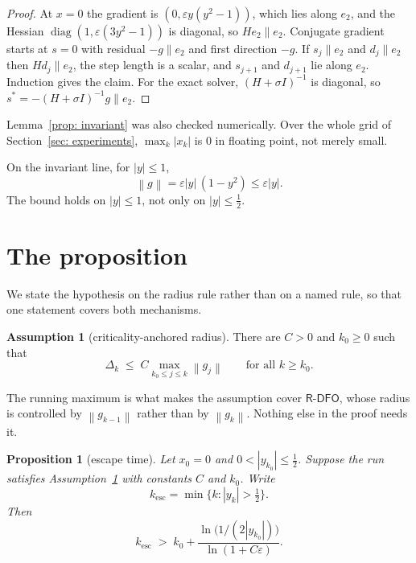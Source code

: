 \documentclass[11pt,a4paper]{article}
\providecommand{\abs}[1]{\left \vert #1 \right \vert}
\providecommand{\norm}[1]{\left \lVert #1 \right \rVert}
\providecommand{\Rdfo}{\textsf{R-DFO}}
\newtheorem{proposition}{Proposition}
\theoremstyle{definition}
\newtheorem{assumption}{Assumption}
\theoremstyle{remark}
\begin{document}
\begin{proof}
  At $x = 0$ the gradient is $(0, \varepsilon y(y^2-1))$, which lies along
  $e_2$, and the Hessian $\operatorname{diag}(1, \varepsilon(3y^2-1))$ is
  diagonal, so $He_2 \parallel e_2$. Conjugate gradient starts at $s = 0$ with
  residual $-g \parallel e_2$ and first direction $-g$. If $s_j \parallel e_2$
  and $d_j \parallel e_2$ then $Hd_j \parallel e_2$, the step length is a
  scalar, and $s_{j+1}$ and $d_{j+1}$ lie along $e_2$. Induction gives the
  claim. For the exact solver, $(H+\sigma I)^{-1}$ is diagonal, so
  $s^* = -(H+\sigma I)^{-1}g \parallel e_2$.
\end{proof}

Lemma~\ref{prop: invariant} was also checked numerically. Over the whole grid of
Section~\ref{sec: experiments}, $\max_k\abs{x_k}$ is $0$ in floating point, not
merely small.

On the invariant line, for $\abs{y} \leq 1$,
\begin{equation}
  \norm{g} = \varepsilon\abs{y}\,(1 - y^2) \leq \varepsilon\abs{y} .
  \label{eqn: gradient bound}
\end{equation}
The bound holds on $\abs{y} \leq 1$, not only on $\abs{y} \leq \tfrac12$.

\section{The proposition}\label{sec: proposition}

We state the hypothesis on the radius rule rather than on a named rule, so that
one statement covers both mechanisms.

\begin{assumption}[criticality-anchored radius]\label{as: RCA}
  There are $C > 0$ and $k_0 \geq 0$ such that
  \[
    \Delta_k \;\leq\; C \max_{k_0 \leq j \leq k} \norm{g_j}
    \qquad\text{for all } k \geq k_0 .
  \]
\end{assumption}

The running maximum is what makes the assumption cover $\Rdfo$, whose radius is
controlled by $\norm{g_{k-1}}$ rather than by $\norm{g_k}$. Nothing else in the
proof needs it.

\begin{proposition}[escape time]\label{prop: escape}
  Let $x_0 = 0$ and $0 < \abs{y_{k_0}} \leq \tfrac12$. Suppose the run satisfies
  Assumption~\ref{as: RCA} with constants $C$ and $k_0$. Write
  \[
    k_{\mathrm{esc}} = \min\{k : \abs{y_k} > \tfrac12\} .
  \]
  Then
  \begin{equation}
    k_{\mathrm{esc}} \;>\; k_0
      + \frac{\ln\bigl(1/(2\abs{y_{k_0}})\bigr)}{\ln(1 + C\varepsilon)} .
    \label{eqn: escape}
  \end{equation}
\end{proposition}
\end{document}
